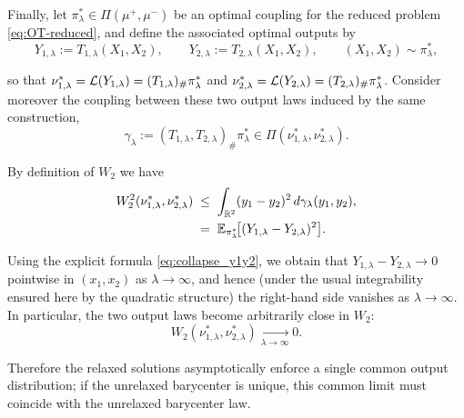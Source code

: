 \documentclass[11pt]{article}
\begin{document}
\begin{remark}
  Finally, let $\pi_\lambda^*\in\Pi(\mu^+,\mu^-)$ be an optimal coupling for the reduced problem
\eqref{eq:OT-reduced}, and define the associated optimal outputs by
\begin{equation*}
  Y_{1,\lambda}:=T_{1,\lambda}(X_1,X_2),\qquad Y_{2,\lambda}:=T_{2,\lambda}(X_1,X_2),
\qquad (X_1,X_2)\sim \pi_\lambda^*,
\end{equation*}

so that $\nu_{1,\lambda}^*=\mathcal{L}(Y_{1,\lambda})=(T_{1,\lambda})_\#\pi_\lambda^*$ and
$\nu_{2,\lambda}^*=\mathcal{L}(Y_{2,\lambda})=(T_{2,\lambda})_\#\pi_\lambda^*$.
Consider moreover the coupling between these two output laws induced by the same construction,
\begin{equation*}
  \gamma_\lambda:=(T_{1,\lambda},T_{2,\lambda})_\#\pi_\lambda^*\in\Pi(\nu_{1,\lambda}^*,\nu_{2,\lambda}^*).
\end{equation*}

By definition of $W_2$ we have
\begin{align*}
  W_2^2(\nu_{1,\lambda}^*,\nu_{2,\lambda}^*)
&\;\le\;
\int_{\mathbb{R}^2} (y_1-y_2)^2\,d\gamma_\lambda(y_1,y_2), \\
&\;=\;
\mathbb{E}_{\pi_\lambda^*}\!\big[(Y_{1,\lambda}-Y_{2,\lambda})^2\big].
\end{align*}

Using the explicit formula \eqref{eq:collapse_y1y2}, we obtain that
$Y_{1,\lambda}-Y_{2,\lambda}\to 0$ pointwise in $(x_1,x_2)$ as $\lambda\to\infty$, and hence (under the
usual integrability ensured here by the quadratic structure) the right-hand side vanishes as $\lambda\to\infty$.
In particular, the two output laws become arbitrarily close in $W_2$:
\begin{equation*}
  W_2(\nu_{1,\lambda}^*,\nu_{2,\lambda}^*)\xrightarrow[\lambda\to\infty]{}0.
\end{equation*}

Therefore the relaxed solutions asymptotically enforce a single common output distribution; if the unrelaxed
barycenter is unique, this common limit must coincide with the unrelaxed barycenter law.

  
  \end{remark}


\newpage
\printbibliography
\end{document}
